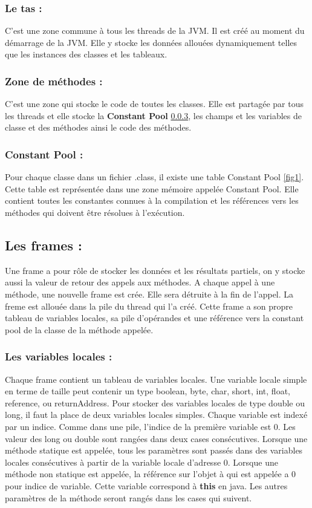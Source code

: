 \documentclass[12pt, a4paper, one side]{article}
\begin{document}
    \subsubsection{Le tas :} C'est une zone commune à tous les threads de la JVM. Il est créé au moment du démarrage de la JVM. Elle y stocke les données allouées dynamiquement telles que les instances des classes et les tableaux.

    \subsubsection{Zone de méthodes :}
    C'est une zone qui stocke le code de toutes les classes. Elle est partagée par tous les threads et elle stocke la \textbf{Constant Pool} \ref{Constant_Pool}, les champs et les variables de classe et des méthodes ainsi le code des méthodes.

    \subsubsection{Constant Pool : } \label{Constant_Pool} Pour chaque classe dans un fichier .class, il existe une table Constant Pool \ref{fig1}. Cette table est représentée dans une zone mémoire appelée Constant Pool. Elle contient toutes les constantes connues à la compilation et les références vers les méthodes qui doivent être résolues à l'exécution.

    \subsection{Les frames :}
    Une frame a pour rôle de stocker les données et les résultats partiels, on y stocke aussi la valeur de retour des appels aux méthodes. A chaque appel à une méthode, une nouvelle frame est crée. Elle sera détruite à la fin de l'appel. La freme est allouée dans la pile du thread qui l'a créé. Cette frame a son propre tableau de variables locales, sa pile d'opérandes et une référence vers la constant pool de la classe de la méthode appelée.

    \subsubsection{Les variables locales :}
    Chaque frame contient un tableau de variables locales. Une variable locale   simple en terme de taille peut contenir un type boolean, byte, char, short, int, float, reference, ou returnAddress. Pour stocker des variables locales de type double ou long, il faut la place de deux variables locales simples.
    Chaque variable est indexé par un indice. Comme dans une pile, l'indice de la première variable est 0. Les valeur des long ou double sont rangées dans deux cases consécutives.
    Lorsque une méthode statique est appelée, tous les paramètres sont passés dans des variables locales consécutives à partir de la variable locale d'adresse 0.
    Lorsque une méthode non statique est appelée, la référence sur l'objet à qui  est appelée a 0 pour indice de variable. Cette variable correspond à \textbf{this} en java. Les autres paramètres de la méthode seront rangés dans les cases qui suivent.
\end{document}
